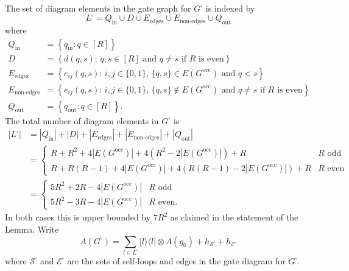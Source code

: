 \documentclass[../thesis-main/thesis-main]{subfiles}
\begin{document}
The set of diagram elements in the gate graph for $G^{\square}$ is indexed by
\begin{equation}
L^{\square}=Q_{\text{in}}\cup D\cup E_{\text{edges}}\cup E_{\text{non-edges}}\cup Q_{\text{out}}\label{eq:L_square}
\end{equation}
where
\begin{align}
Q_{\text{in}} & =\left\{ q_{\mathrm{in}}:q\in[R]\right\} \label{eq:Q_in}\\
D & =\left\{ d(q,s):\, q,s\in[R]\text{ and }q\neq s\text{ if }R\text{ is even}\right\} \label{eq:defn_of D}\\
E_{\text{edges}} & =\left\{ e_{ij}(q,s):\, i,j\in\{0,1\},\,\{q,s\}\in E(G^{\text{occ}})\text{ and }q<s\right\} \nonumber \\
E_{\text{non-edges}} & =\left\{ e_{ij}(q,s):\, i,j\in\{0,1\},\,\{q,s\}\notin E(G^{\text{occ}})\text{ and }q\neq s\text{ if }R\text{ is even}\right\} \nonumber \\
Q_{\text{out}} & =\left\{ q_{\mathrm{out}}:q\in[R]\right\} .\label{eq:Q_out}
\end{align}
The total number of diagram elements in $G^{\square}$ is 
\begin{align*}
|L^{\square}| & =|Q_{\text{in}}|+|D|+|E_{\text{edges}}|+|E_{\text{non-edges}}|+|Q_{\text{out}}|\\
 & =\begin{cases}
R+R^{2}+4|E(G^{\text{occ}})|+4\left(R^{2}-2|E(G^{\text{occ}})|\right)+R & R\text{ odd}\\
R+R\left(R-1\right)+4|E(G^{\text{occ}})|+4\left(R(R-1)-2|E(G^{\text{occ}})|\right)+R & R\text{ even}
\end{cases}\\
 & =\begin{cases}
5R^{2}+2R-4|E(G^{\text{occ}})| & R\text{ odd}\\
5R^{2}-3R-4|E(G^{\text{occ}})| & R\text{ even}.
\end{cases}
\end{align*}
In both cases this is upper bounded by $7R^2$ as claimed in the statement of the Lemma. Write 
\begin{equation}
A(G^{\square})=\sum_{l\in L^{\square}}|l\rangle\langle l|\otimes A(g_{0})+h_{\mathcal{S}^{\square}}+h_{\mathcal{E}^{\square}}\label{eq:A_G_squAre}
\end{equation}
where $\mathcal{S}^{\square}$ and $\mathcal{E}^{\square}$ are the sets of self-loops and edges in the gate diagram for $G^{\square}$. 
\end{document}
